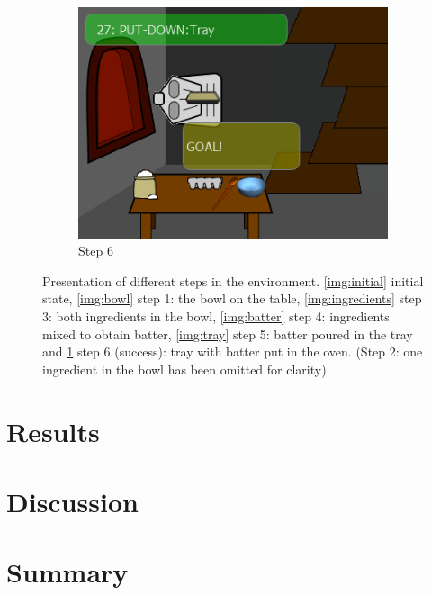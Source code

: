 \begin{figure}[ht]
\begin{subfigure}[b]{0.3\textwidth}
		\includegraphics[width=\textwidth]{step6.png}
		\caption{Step 6}
		\label{img:goal}
	\end{subfigure}
	
	\caption{Presentation of different steps in the environment. \ref{img:initial} initial state, \ref{img:bowl} step 1: the bowl on the table, \ref{img:ingredients} step 3: both ingredients in the bowl, \ref{img:batter} step 4: ingredients mixed to obtain batter, \ref{img:tray} step 5: batter poured in the tray and \ref{img:goal} step 6 (success): tray with batter put in the oven. (Step 2: one ingredient in the bowl has been omitted for clarity)}
	\label{fig:states}
\end{figure}

\section{Results}

\section{Discussion}

\section{Summary}


